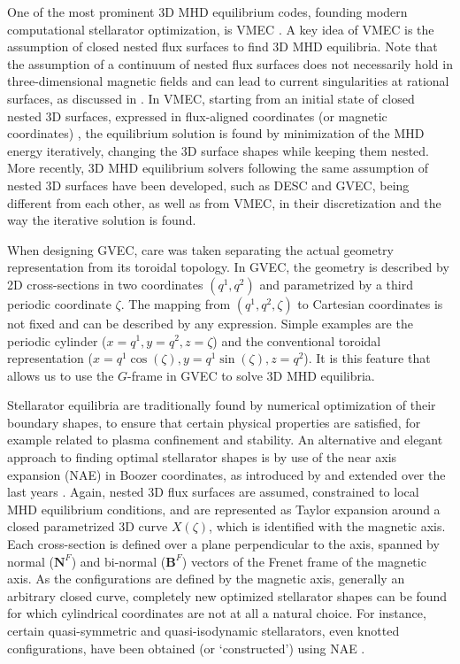 \documentclass[12pt]{iopart}
\newcommand\Nfrenet{{\bm N}^F}
\newcommand\Bfrenet{{\bm B}^F}
\newcommand\GFF{$G$-frame}
\newcommand\binormal[1]{bi-normal{#1}}
\begin{document}
One of the most prominent 3D MHD equilibrium codes, founding modern computational stellarator optimization, is VMEC \cite{hirshman_VMEC_1983,Hirshman1986_vmec_free,Hirshman1991_vmec_precond}. A key idea of VMEC is the assumption of closed nested flux surfaces to find 3D MHD equilibria. 
%
Note that the assumption of a continuum of nested flux surfaces does not necessarily hold in three-dimensional magnetic fields and can lead to current singularities at rational surfaces, as discussed in \cite{Huang_2023}. 
%
In VMEC, starting from an initial state of closed nested 3D surfaces, expressed in flux-aligned coordinates (or magnetic coordinates) \cite{Dhaeseleer1991}, the equilibrium solution is found by minimization of the MHD energy iteratively, changing the 3D surface shapes while keeping them nested. 
More recently, 3D MHD equilibrium solvers following the same assumption of nested 3D surfaces have been developed, such as DESC\cite{dudt_DESC_2020} and GVEC\cite{gvec-2019}, being different from each other, as well as from VMEC, in their discretization and the way the iterative solution is found. 

When designing GVEC, care was taken separating the actual geometry representation from its toroidal topology. In GVEC, the geometry is described by 2D cross-sections in two coordinates $(q^1,q^2)$ and parametrized by a third periodic coordinate $\zeta$. The mapping from $(q^1,q^2,\zeta)$ to Cartesian coordinates is not fixed and can be described by any expression. Simple examples are the periodic cylinder ($x=q^1,y=q^2,z=\zeta$) and the conventional toroidal representation ($x=q^1\cos(\zeta), y=q^1\sin(\zeta), z=q^2$). It is this feature that allows us to use the \GFF{} in GVEC to solve 3D MHD equilibria.

Stellarator equilibria are traditionally found by numerical optimization of their boundary shapes, to ensure that certain physical properties are satisfied, for example related to plasma confinement and stability.  An alternative and elegant approach to finding optimal stellarator shapes is by use of the near axis expansion (NAE) in Boozer coordinates, as introduced by \cite{garren-boozer-1, garren-boozer-2} and extended over the last years \cite{landreman-sengupta, landreman-sengupta-plunk, plunk_landreman_helander_2019}. Again, nested 3D flux surfaces are assumed, constrained to local MHD equilibrium conditions, and are represented as Taylor expansion around a closed parametrized 3D curve $X(\zeta)$, which is identified with the magnetic axis. Each cross-section is defined over a plane perpendicular to the axis, spanned by normal ($\Nfrenet$) and \binormal{ } ($\Bfrenet$) vectors of the Frenet frame of the magnetic axis. As the configurations are defined by the magnetic axis, generally an arbitrary closed curve, completely new optimized stellarator shapes can be found for which cylindrical coordinates are not at all a natural choice. For instance, certain quasi-symmetric and quasi-isodynamic stellarators, even knotted configurations, have been obtained (or `constructed') using NAE \cite{Landreman_Sengupta_2019, camacho-mata_plunk_2022, plunk2024-QI}.
\end{document}
